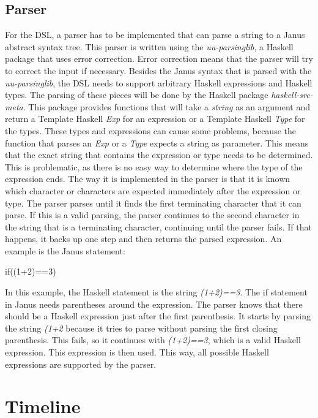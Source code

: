 \documentclass[12pt,a4paper]{article}
\begin{document}
\subsection{Parser}
For the DSL, a parser has to be implemented that can parse a string to a Janus abstract syntax tree. This parser is written using the \textit{uu-parsinglib}, a Haskell package that uses error correction. Error correction means that the parser will try to correct the input if necessary. Besides the Janus syntax that is parsed with the \textit{uu-parsinglib}, the DSL needs to support arbitrary Haskell expressions and Haskell types. The parsing of these pieces will be done by the Haskell package \textit{haskell-src-meta}. This package provides functions that will take a \textit{string} as an argument and return a Template Haskell \textit{Exp} for an expression or a Template Haskell \textit{Type} for the types. These types and expressions can cause some problems, because the function that parses an \textit{Exp} or a \textit{Type} expects a string as parameter. This means that the exact string that contains the expression or type needs to be determined. This is problematic, as there is no easy way to determine where the type of the expression ends. The way it is implemented in the parser is that it is known which character or characters are expected immediately after the expression or type. The parser parses until it finds the first terminating character that it can parse. If this is a valid parsing, the parser continues to the second character in the string that is a terminating character, continuing until the parser fails. If that happens, it backs up one step and then returns the parsed expression. An example is the Janus statement:
	\begin{displayquote}
		if((1+2)==3)
	\end{displayquote}
In this example, the Haskell statement is the string \textit{(1+2)==3}. The if statement in Janus needs parentheses around the expression. The parser knows that there should be a Haskell expression just after the first parenthesis. It starts by parsing the string \textit{(1+2} because it tries to parse without parsing the first closing parenthesis. This fails, so it continues with \textit{(1+2)==3}, which is a valid Haskell expression. This expression is then used. This way, all possible Haskell expressions are supported by the parser.

\section{Timeline}
\end{document}
